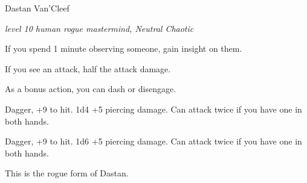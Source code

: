 \begin{monsterbox}{Dastan Van'Cleef}
	\begin{hangingpar}
		\textit{level 10 human rogue mastermind, Neutral Chaotic}
	\end{hangingpar}
	\dndline%
	\basics[%
	armorclass = 18,
	hitpoints  = 81,
	speed      = 30 ft
	]
	\dndline%
	\stats[
	STR = \stat{8}, %
	DEX = \stat{20},
	CON = \stat{16},
	INT = \stat{12},
	WIS = \stat{11},
	CHA = \stat{17}
	]
	\dndline%
	\details[%
	languages = {Common, Elvish, Dwarvish, Gnomish, Halfling, Celestial, Draconic, Primordial},
	challenge = 10
	]
	\dndline%
	\begin{monsteraction}
		If you spend 1 minute observing someone, gain insight on them.
	\end{monsteraction}	
	\begin{monsteraction}
		If you see an attack, half the attack damage.
	\end{monsteraction}
	\begin{monsteraction}
		As a bonus action, you can dash or disengage.
	\end{monsteraction}
	\begin{monsteraction}
		Dagger, +9 to hit. 1d4 +5 piercing damage. Can attack twice if you have one in both hands.
	\end{monsteraction}
	\begin{monsteraction}
		Dagger, +9 to hit. 1d6 +5 piercing damage. Can attack twice if you have one in both hands.
	\end{monsteraction}
	This is the rogue form of Dastan.
\end{monsterbox}

